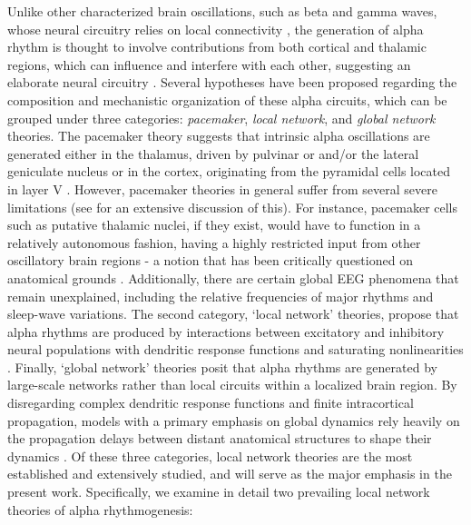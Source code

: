 \documentclass[12pt,twoside]{article}
\begin{document}
Unlike other characterized brain oscillations, such as beta and gamma waves, whose neural circuitry relies on local connectivity \citep{lozano2018physiological}, the generation of alpha rhythm is thought to involve contributions from both cortical and thalamic regions, which can influence and interfere with each other, suggesting an elaborate neural circuitry \citep{lozano2018physiological,da1991neural}. Several hypotheses have been proposed regarding the composition and mechanistic organization of these alpha circuits, which can be grouped under three categories: \textit{pacemaker}, \textit{local network}, and \textit{global network} theories. The pacemaker theory suggests that intrinsic alpha oscillations are generated either in the thalamus, driven by pulvinar or and/or the lateral geniculate nucleus \citep{saalmann2012pulvinar, lHorincz2009temporal, hughes2011thalamic} or in the cortex, originating from the pyramidal cells located in layer V \citep{da1991neural, connors1997making, bollimunta2008neuronal}. However, pacemaker theories in general suffer from several severe limitations (see \citealt{nunez2006electric} for an extensive discussion of this). For instance, pacemaker cells such as putative thalamic nuclei, if they exist, would have to function in a relatively autonomous fashion, having a highly restricted input from other oscillatory brain regions - a notion that has been critically questioned on anatomical grounds \citep{lopes1998dynamics, steriade2005cellular}. Additionally, there are certain global EEG phenomena that remain unexplained, including the relative frequencies of major rhythms and sleep-wave variations. The second category, `local network' theories,  propose that alpha rhythms are produced by interactions between excitatory and inhibitory neural populations with dendritic response functions and saturating nonlinearities \citep{valdes2010white}. Finally, `global network' theories posit that alpha rhythms are generated by large-scale networks rather than local circuits within a localized brain region. %
By disregarding complex dendritic response functions and finite intracortical propagation, models with a primary emphasis on global dynamics rely heavily on the propagation delays between distant anatomical structures to shape their dynamics \citep{nunez1995neocortical, nunez2006theoretical, valdes2010white}. Of these three categories, local network theories are the most established and extensively studied, and will serve as the major emphasis in the present work. Specifically, we examine in detail two prevailing local network theories of alpha rhythmogenesis: 
\end{document}

